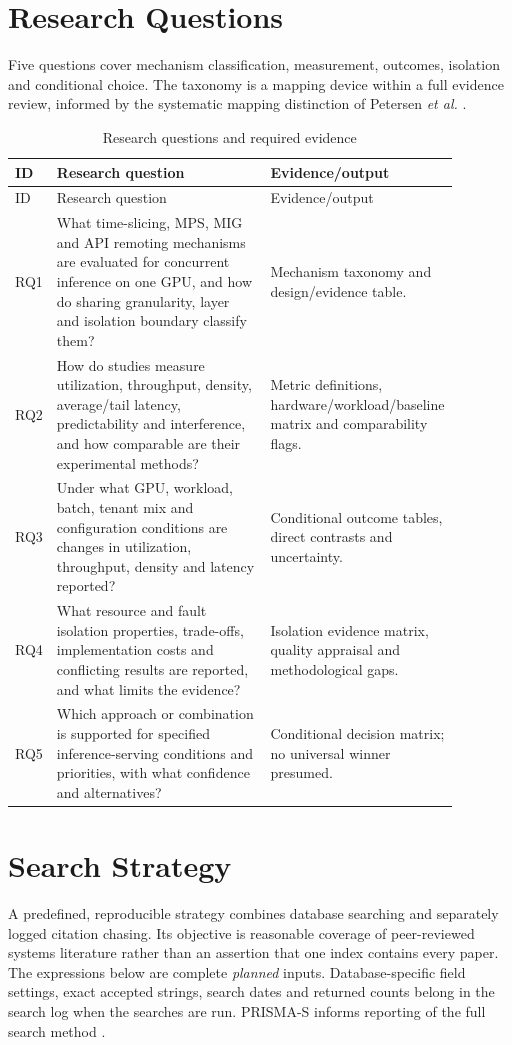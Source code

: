 \documentclass[12pt,a4paper]{article}
\begin{document}
\section{Research Questions}
Five questions cover mechanism classification, measurement, outcomes, isolation and conditional choice. The taxonomy is a mapping device within a full evidence review, informed by the systematic mapping distinction of Petersen \emph{et al.} \cite{petersen}.

\begin{longtable}{p{0.07\linewidth}p{0.49\linewidth}p{0.32\linewidth}}
\caption{Research questions and required evidence}\label{tab:rq}\\\toprule ID & Research question & Evidence/output\\\midrule\endfirsthead
\toprule ID & Research question & Evidence/output\\\midrule\endhead
RQ1 & What time-slicing, MPS, MIG and API remoting mechanisms are evaluated for concurrent inference on one GPU, and how do sharing granularity, layer and isolation boundary classify them? & Mechanism taxonomy and design/evidence table.\\
RQ2 & How do studies measure utilization, throughput, density, average/tail latency, predictability and interference, and how comparable are their experimental methods? & Metric definitions, hardware/workload/baseline matrix and comparability flags.\\
RQ3 & Under what GPU, workload, batch, tenant mix and configuration conditions are changes in utilization, throughput, density and latency reported? & Conditional outcome tables, direct contrasts and uncertainty.\\
RQ4 & What resource and fault isolation properties, trade-offs, implementation costs and conflicting results are reported, and what limits the evidence? & Isolation evidence matrix, quality appraisal and methodological gaps.\\
RQ5 & Which approach or combination is supported for specified inference-serving conditions and priorities, with what confidence and alternatives? & Conditional decision matrix; no universal winner presumed.\\\bottomrule
\end{longtable}

\section{Search Strategy}
A predefined, reproducible strategy combines database searching and separately logged citation chasing. Its objective is reasonable coverage of peer-reviewed systems literature rather than an assertion that one index contains every paper. The expressions below are complete \emph{planned} inputs. Database-specific field settings, exact accepted strings, search dates and returned counts belong in the search log when the searches are run. PRISMA-S informs reporting of the full search method \cite{prismas}.
\end{document}
